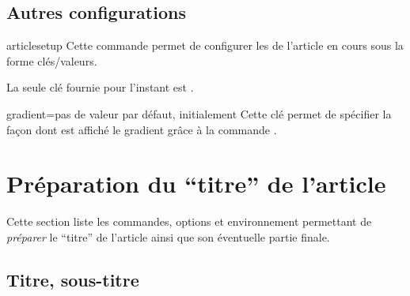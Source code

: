 \documentclass[french,nolocaltoc]{nwejmart}
\newtheorem[style=definition]{fait}
\newtheorem[title=expérience]{experience}
\newtheorem[title-plural=anneaux]{anneau}
\newtheorem[title=idéal,title-plural=idéaux]{ideal}
\begin{document}
\subsection{Autres configurations}
\label{sec:autr-conf}

\begin{docCommand}{articlesetup}{}
  Cette commande permet de configurer les  de l'article en cours
  sous la forme clés/valeurs.

  La seule clé fournie pour l'instant est .
  \begin{docKey}{gradient}{=\textbar{}}{pas
      de valeur par défaut, initialement }
    Cette clé permet de spécifier la façon dont est affiché le gradient grâce
    à la commande .
  \end{docKey}
\end{docCommand}


\section{Préparation du \enquote{titre} de l'article}
\label{sec-prep-de-lart}

Cette section liste les commandes, options et environnement permettant de
\emph{préparer} le \enquote{titre} de l'article ainsi que son éventuelle partie
finale.

\subsection{Titre, sous-titre}
\label{sec-titre}
\end{document}
